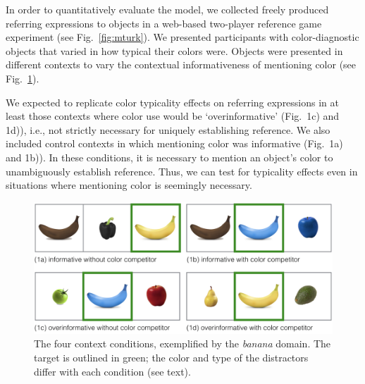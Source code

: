 \documentclass[10pt,letterpaper]{article}
\newcommand{\figref}[1]{Fig.~\ref{#1}}
\begin{document}
In order to quantitatively evaluate the model, we collected freely produced referring expressions to objects in a web-based two-player reference game experiment (see \figref{fig:mturk}). We presented participants with color-diagnostic objects that varied in how typical their colors were. Objects were presented in different contexts to vary the contextual informativeness of mentioning color (see \figref{fig:contexts}). 


We expected to replicate color typicality effects on referring expressions in at least those contexts where color use would be `overinformative' (Fig.~1c) and 1d)), i.e., not strictly necessary for uniquely establishing reference. We also included control contexts in which mentioning color was informative (Fig.~1a) and 1b)). In these conditions, it is necessary to mention an object's color to unambiguously establish reference. Thus, we can test for typicality effects even in situations where mentioning color is seemingly necessary.

\begin{figure}
	\centering
	\includegraphics[width=.6\textwidth]{graphs/context_overview}
	\caption{The four context conditions, exemplified by the \textit{banana} domain. The target is outlined in green; the color and type of the distractors differ with each condition (see text).
	}
	\label{fig:contexts}
\end{figure}
\end{document}
